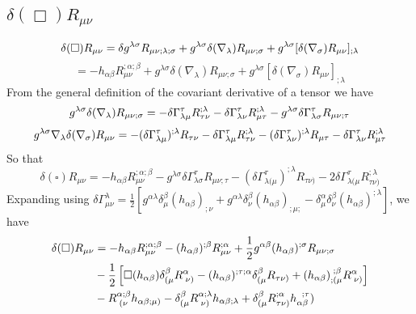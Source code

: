 \subsection{$\delta(\Box)R_{\mu\nu}$}
\label{sec:dS2}
\[
\nonumber
\delta(\square)R_{\mu\nu}=\delta
g^{\lambda\sigma}R_{\mu\nu;\lambda;\sigma}+g^{\lambda\sigma}\delta(\nabla_{
\lambda})R_{\mu\nu;\sigma}+g^{\lambda\sigma}[\delta(\nabla_{\sigma})R_{\mu\nu}]_
{;\lambda}
\]
\[
=-h_{\alpha\beta}R_{\mu\nu}^{;\alpha;\beta}+g^{\lambda\sigma}\delta(\nabla_{
\lambda})R_{\mu\nu;\sigma}+g^{\lambda\sigma}[\delta(\nabla_{\sigma})R_{\mu\nu}]_
{;\lambda}
\]
From the general definition of the covariant derivative of a tensor we have
\[
g^{\lambda\sigma}\delta(\nabla_{\lambda})R_{\mu\nu;\sigma}=-\delta\Gamma_{
\lambda\mu}^{\tau}R_{\tau\nu}^{;\lambda}-\delta\Gamma_{\lambda\nu}^{\tau}R_{
\mu\tau}^{;\lambda}-g^{\lambda\sigma}\delta\Gamma_{\lambda\sigma}^{\tau}R_{
\mu\nu;\tau}
\]
\[
g^{\lambda\sigma}\nabla_{\lambda}\delta(\nabla_{\sigma})R_{\mu\nu}
=-(\delta\Gamma_{\lambda\mu}^{\tau})^{;\lambda}R_{\tau\nu}-\delta\Gamma_{
\lambda\mu}^{\tau}R_{\tau\nu}^{;\lambda}-(\delta\Gamma_{\lambda\nu}^{\tau})^{
;\lambda}R_{\mu\tau}-\delta\Gamma_{\lambda\nu}^{\tau}R_{\mu\tau}^{;\lambda}
\]
So that
\[
\delta(\square)R_{\mu\nu}=-h_{\alpha\beta}R_{\mu\nu}^{;\alpha;\beta}-g^{
\lambda\sigma}\delta\Gamma_{\lambda\sigma}^{\tau}R_{\mu\nu;\tau}-(\delta\Gamma_{
\lambda(\mu}^{\tau})^{;\lambda}R_{\tau\nu)}-2\delta\Gamma_{\lambda(\mu}^{\tau}R_
{\tau\nu)}^{;\lambda}
\]
Expanding using
$\delta\Gamma_{\mu\nu}^{\lambda}=\frac{1}{2}[g^{\alpha\lambda}\delta_{\mu}^{
\beta}(h_{\alpha\beta})_{;\nu}+g^{\alpha\lambda}\delta_{\nu}^{\beta}(h_{
\alpha\beta})_{;\mu;}-\delta_{\mu}^{\alpha}\delta_{\nu}^{\beta}(h_{\alpha\beta}
)^{;\lambda}]$, we have
\begin{align}\nonumber
\delta(\square)R_{\mu\nu}&=-h_{\alpha\beta}R_{\mu\nu}^{;\alpha;\beta}-(h_{
\alpha\beta})^{;\beta}R_{\mu\nu}^{;\alpha}+\frac{1}{2}g^{\alpha\beta}(h_{
\alpha\beta})^{;\sigma}R_{\mu\nu;\sigma}
\\&\nonumber
-\frac{1}{2}\left[\square(h_{\alpha\beta})\delta_{(\mu}^{\beta}R_{\;\nu)}^{
\alpha}-(h_{\alpha\beta})^{;\tau;\alpha}\delta_{(\mu}^{\beta}R_{\tau\nu)}+(h_{
\alpha\beta})_{;(\mu}^{\;;\beta}R_{\;\nu)}^{\alpha}\right]
\\&
-R_{\;(\nu}^{\alpha;\beta}h_{\alpha\beta;\mu)}-\delta_{(\mu}^{\beta}R_{\;\nu)}^{
\alpha;\lambda}h_{\alpha\beta;\lambda}+\delta_{(\mu}^{\beta}R_{\tau\nu)}^{
;\alpha}h_{\alpha\beta}^{\;\;;\tau})
\end{align}
